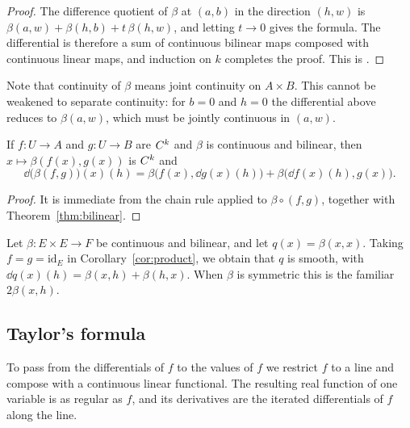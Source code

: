 \begin{proof}
  \leanok
  The difference quotient of $\beta$ at $(a,b)$ in the direction $(h,w)$ is
  $\beta(a, w) + \beta(h, b) + t\,\beta(h, w)$, and letting $t \to 0$ gives the formula. The
  differential is therefore a sum of continuous bilinear maps composed with continuous linear
  maps, and induction on $k$ completes the proof. This is \cite[1.2.3 and 1.3.5]{GN26}.
\end{proof}

Note that continuity of $\beta$ means joint continuity on $A \times B$. This cannot be
weakened to separate continuity: for $b = 0$ and $h = 0$ the differential above reduces to
$\beta(a, w)$, which must be jointly continuous in $(a, w)$.

\begin{corollary}
  \label{cor:product}
  \leanok
  If $f \colon U \to A$ and $g \colon U \to B$ are $C^{k}$ and $\beta$ is continuous and
  bilinear, then $x \mapsto \beta(f(x), g(x))$ is $C^{k}$ and
  \[
    \dd\bigl(\beta(f, g)\bigr)(x)(h) = \beta\bigl(f(x), \dd g(x)(h)\bigr)
      + \beta\bigl(\dd f(x)(h), g(x)\bigr).
  \]
\end{corollary}

\begin{proof}
  \leanok
  It is immediate from the chain rule applied to $\beta \circ (f, g)$, together with
  Theorem~\ref{thm:bilinear}.
\end{proof}

\begin{example}
  Let $\beta \colon E \times E \to F$ be continuous and bilinear, and let
  $q(x) = \beta(x, x)$. Taking $f = g = \mathrm{id}_E$ in Corollary~\ref{cor:product}, we
  obtain that $q$ is smooth, with $\dd q(x)(h) = \beta(x, h) + \beta(h, x)$. When $\beta$ is
  symmetric this is the familiar $2\beta(x, h)$.
\end{example}

\subsection{Taylor's formula}

To pass from the differentials of $f$ to the values of $f$ we restrict $f$ to a line and
compose with a continuous linear functional. The resulting real function of one variable is
as regular as $f$, and its derivatives are the iterated differentials of $f$ along the line.

